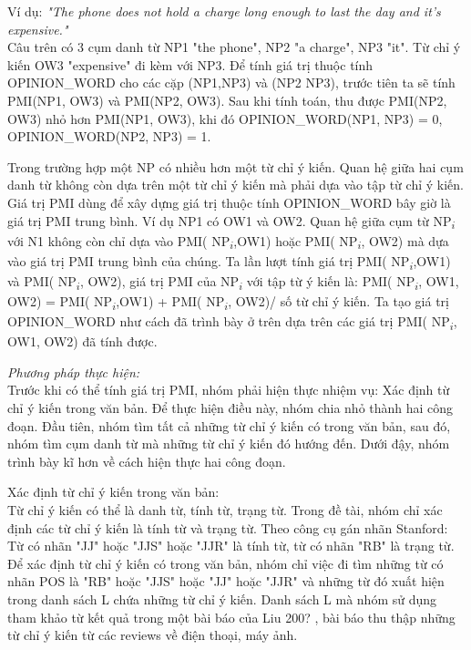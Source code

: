 \documentclass[12pt]{extarticle}
\begin{document}
				\par Ví dụ: \textit{"The phone does not hold a charge long enough to last the day and it’s expensive."}
				\\Câu trên có 3 cụm danh từ NP1 "the phone", NP2 "a charge", NP3 "it". Từ chỉ ý kiến OW3 "expensive" đi kèm với NP3. Để tính giá trị thuộc tính OPINION\_WORD cho các cặp (NP1,NP3) và (NP2 NP3), trước tiên ta sẽ tính PMI(NP1, OW3) và PMI(NP2, OW3). Sau khi tính toán, thu được PMI(NP2, OW3) nhỏ hơn PMI(NP1, OW3), khi đó OPINION\_WORD(NP1, NP3) = 0, OPINION\_WORD(NP2, NP3) = 1.
				\par Trong trường hợp một NP có nhiều hơn một từ chỉ ý kiến. Quan hệ giữa hai cụm danh từ không còn dựa trên một từ chỉ ý kiến mà phải dựa vào tập từ chỉ ý kiến. Giá trị PMI dùng để xây dựng giá trị thuộc tính OPINION\_WORD bây giờ là giá trị PMI trung bình. Ví dụ NP1 có OW1 và OW2. Quan hệ giữa cụm từ  NP\textsubscript{$i$} với N1 không còn chỉ dựa vào PMI( NP\textsubscript{$i$},OW1) hoặc PMI( NP\textsubscript{$i$}, OW2) mà dựa vào giá trị PMI trung bình của chúng. Ta lần lượt tính giá trị PMI( NP\textsubscript{$i$},OW1) và PMI( NP\textsubscript{$i$}, OW2), giá trị PMI của  NP\textsubscript{$i$} với tập từ ý kiến là:
				PMI( NP\textsubscript{$i$}, {OW1, OW2}) = PMI( NP\textsubscript{$i$},OW1) + PMI( NP\textsubscript{$i$}, OW2)/ số từ chỉ ý kiến. 
				Ta tạo giá trị OPINION\_WORD như cách đã trình bày ở trên dựa trên các giá trị PMI( NP\textsubscript{$i$}, {OW1, OW2}) đã tính được.
				\par \textit{Phương pháp thực hiện:}
				\\Trước khi có thể tính giá trị PMI, nhóm phải hiện thực nhiệm vụ: Xác định từ chỉ ý kiến trong văn bản. Để thực hiện điều này, nhóm chia nhỏ thành hai công đoạn. Đầu tiên, nhóm tìm tất cả những từ chỉ ý kiến có trong văn bản, sau đó, nhóm tìm cụm danh từ mà những từ chỉ ý kiến đó hướng đến. Dưới đậy, nhóm trình bày kĩ hơn về cách hiện thực hai công đoạn.
				\par Xác định từ chỉ ý kiến trong văn bản:
				\\Từ chỉ ý kiến có thể là danh từ, tính từ, trạng từ. Trong đề tài, nhóm chỉ xác định các từ chỉ ý kiến là tính từ và trạng từ. Theo công cụ gán nhãn Stanford: Từ có nhãn "JJ" hoặc "JJS" hoặc "JJR" là tính từ, từ có nhãn "RB" là trạng từ. Để xác định từ chỉ ý kiến có trong văn bản, nhóm chỉ việc đi tìm những từ có nhãn POS là "RB" hoặc "JJS" hoặc "JJ" hoặc "JJR" và những từ đó xuất hiện trong danh sách L chứa những từ chỉ ý kiến. Danh sách L mà nhóm sử dụng tham khảo từ kết quả trong một bài báo của Liu 200? , bài báo thu thập những từ chỉ ý kiến từ các reviews về điện thoại, máy ảnh.
\end{document}

